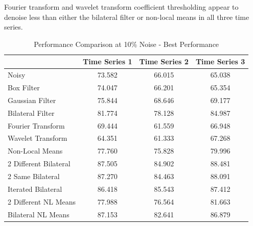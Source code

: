 \documentclass[11pt]{article}
\theoremstyle{definition}
\begin{document}
Fourier transform and wavelet transform coefficient thresholding
appear to denoise less than either the bilateral filter or non-local
means in all three time series.

\begin{table}
\small
\begin{center}
\begin{tabular}{lccc}
\hline 
 & Time Series 1 & Time Series 2 & Time Series 3 \\ \hline
Noisy & 73.582 & 66.015 & 65.038 \\ \hline
Box Filter & 74.047 & 66.201 & 65.354 \\ \hline
Gaussian Filter & 75.844 & 68.646 & 69.177 \\ \hline
Bilateral Filter & 81.774 & 78.128 & 84.987 \\ \hline
Fourier Transform & 69.444 & 61.559 & 66.948 \\ \hline
Wavelet Transform & 64.351 & 61.333 & 67.268 \\ \hline
Non-Local Means & 77.760 & 75.828 & 79.996 \\ \hline
2 Different Bilateral & 87.505 & 84.902 & 88.481 \\ \hline
2 Same Bilateral & 87.270 & 84.463 & 88.091 \\ \hline
Iterated Bilateral & 86.418 & 85.543 & 87.412 \\ \hline
2 Different NL Means & 77.988 & 76.564 & 81.663 \\ \hline
Bilateral NL Means & 87.153 & 82.641 & 86.879 \\ \hline 
\end{tabular}
\caption{Performance Comparison at 10\% Noise - Best Performance}
\label{comparisonbest}
\end{center}
\end{table}
\end{document}
